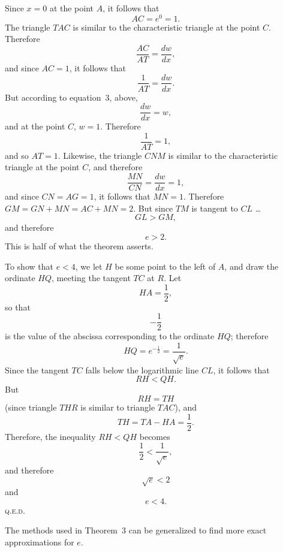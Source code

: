 \documentclass[polutonikogreek,english,twoside,openright]{article}
\begin{document}

Since $x=0$ at the point $A$, it follows that 
\[AC = e^0 = 1.\]
The triangle $TAC$ is similar to the characteristic triangle at the point $C$.  Therefore 
\[\frac{AC}{AT} =  \frac{dw}{dx},\]
and since $AC  =1$, it follows that 
\[\frac{1}{AT}= \frac{dw}{dx}.\]
But according to equation~3, above, 
\[\frac{dw}{dx} = w,\]
and at the point $C$, $w=1$.
Therefore 
\[\frac{1}{AT} = 1,\]
and so $AT =1$.
Likewise, the triangle $CNM$ is similar to the characteristic triangle at the point $C$, and therefore
\[\frac{MN}{CN} = \frac{dw}{dx} = 1,\]
and since $CN = AG =1$, it follows that $MN =1$.
Therefore $GM = GN + MN = AC + MN = 2$.  But since $TM$ is tangent to $CL$ \ldots
$$GL > GM,$$
and therefore 
$$e>2.$$  This is half of what the theorem asserts.

To show that $e<4$, we let $H$ be some point to the left of $A$, and draw the ordinate $HQ$, meeting the tangent $TC$ at $R$.    Let 
$$HA = \frac{1}{2},$$ so that 
$$-\frac{1}{2}$$
 is the value of the abscissa corresponding to the ordinate $HQ$; therefore 
$$HQ = e^{-\frac{1}{2}} = \frac{1}{\sqrt{e}}.$$
Since the tangent $TC$ falls below the logarithmic line $CL$, it follows that
$$RH <QH.$$
But 
$$RH = TH$$
(since triangle $THR$ is similar to triangle $TAC$),
and 
$$TH = TA - HA = \frac{1}{2}.$$
Therefore, the inequality $RH < QH$ becomes
$$\frac{1}{2}  < \frac{1}{\sqrt{e}},$$
and therefore
$$\sqrt{e} < 2$$
and 
$$e <4.$$ \textsc{q.e.d.}

The methods used in Theorem~3 can be generalized to find more exact approximations for $e$.


\end{document}
